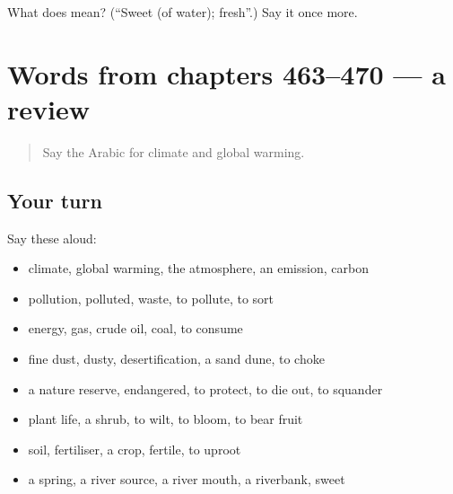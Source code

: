 \begin{tcolorbox}[breakable,colback=teal!4,colframe=teal!35!black,title={Before you move on}]
What does  mean? (\textquotedblleft{}Sweet (of water); fresh\textquotedblright{}.) Say it once more.
\end{tcolorbox}
\section[(dialogue)]{Words from chapters 463–470 — a review}

\label{lesson:AR-R470-review-463-470}



\begin{quote}
Say the Arabic for climate and global warming.
\end{quote}

\subsection*{Your turn}
Say these aloud:

\begin{itemize}
\raggedright
  \item climate, global warming, the atmosphere, an emission, carbon
  \item pollution, polluted, waste, to pollute, to sort
  \item energy, gas, crude oil, coal, to consume
  \item fine dust, dusty, desertification, a sand dune, to choke
  \item a nature reserve, endangered, to protect, to die out, to squander
  \item plant life, a shrub, to wilt, to bloom, to bear fruit
  \item soil, fertiliser, a crop, fertile, to uproot
  \item a spring, a river source, a river mouth, a riverbank, sweet
\end{itemize}

